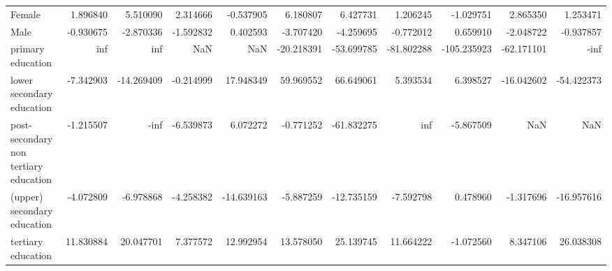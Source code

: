 \documentclass[11pt]{article}
\begin{document}
\begin{table}[!htbp]
{\begin{tabular}{lrrrrrrrrrr}
Female                                &   1.896840 &   5.510090 &   2.314666 &   -0.537905 &   6.180807 &   6.427731 &   1.206245 &   -1.029751 &   2.865350 &    1.253471 \\
Male                                  &  -0.930675 &  -2.870336 &  -1.592832 &    0.402593 &  -3.707420 &  -4.259695 &  -0.772012 &    0.659910 &  -2.048722 &   -0.937857 \\
primary education                     &        inf &        inf &        NaN &         NaN & -20.218391 & -53.699785 & -81.802288 & -105.235923 & -62.171101 &        -inf \\
lower secondary education             &  -7.342903 & -14.269409 &  -0.214999 &   17.948349 &  59.969552 &  66.649061 &   5.393534 &    6.398527 & -16.042602 &  -54.422373 \\
post-secondary non tertiary education &  -1.215507 &       -inf &  -6.539873 &    6.072272 &  -0.771252 & -61.832275 &        inf &   -5.867509 &        NaN &         NaN \\
(upper) secondary education           &  -4.072809 &  -6.978868 &  -4.258382 &  -14.639163 &  -5.887259 & -12.735159 &  -7.592798 &    0.478960 &  -1.317696 &  -16.957616 \\
tertiary education                    &  11.830884 &  20.047701 &   7.377572 &   12.992954 &  13.578050 &  25.139745 &  11.664222 &   -1.072560 &   8.347106 &   26.038308 \\
\bottomrule
\end{tabular}

}
\end{table}
\end{document}
